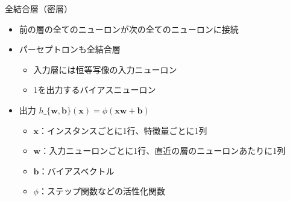 \documentclass[aspectratio=169, dvipdfmx, 14pt, xcolor={svgnames,dvipsnames}]{beamer}
\def\tightlist{\itemsep1pt\parskip0pt\parsep0pt}
\begin{document}

\begin{frame}{\quad 全結合層（密層）}
  \begin{itemize}
    \item
          \alert{前の層の全てのニューロンが次の全てのニューロンに接続}
    \item
          パーセプトロンも全結合層

          \begin{itemize}
            \tightlist
            \item
                  入力層には恒等写像の入力ニューロン
            \item
                  1を出力するバイアスニューロン
          \end{itemize}
    \item
          出力 $h\_\{\bm{w}, \bm{b}\} (\bm{x}) = \phi(\bm{x}\bm{w} + \bm{b})$

          \begin{itemize}
            \tightlist
            \item
                  $\bm{x}$：インスタンスごとに1行、特徴量ごとに1列
            \item
                  $\bm{w}$：入力ニューロンごとに1行、直近の層のニューロンあたりに1列
            \item
                  $\bm{b}$：バイアスベクトル
            \item
                  $\phi$：ステップ関数などの活性化関数
          \end{itemize}
  \end{itemize}
\end{frame}

\end{document}
